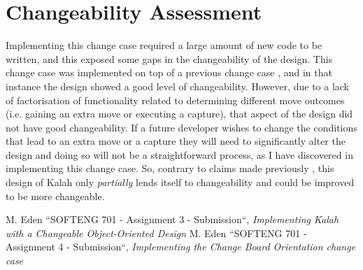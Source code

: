 \documentclass[10pt, a4paper, conference]{IEEEtran}
\begin{document}
\section{Changeability Assessment}
Implementing this change case required a large amount of new code to be
written, and this exposed some gaps in the changeability of the design. This
change case was implemented on top of a previous change case
\cite{a4-change-case}, and in that instance the design showed a good level of 
changeability. However, due to a lack of factorisation of functionality related
to determining different move outcomes (i.e. gaining an extra move or executing
a capture), that aspect of the design did not have good changeability. If
a future developer wishes to change the conditions that lead to an extra move
or a capture they will need to significantly alter the design and doing so will
not be a straightforward process, as I have discovered in implementing this
change case. So, contrary to claims made previously \cite{a3-design}, this
design of Kalah only \textit{partially} lends itself to changeability and could
be improved to be more changeable.

\begin{thebibliography}{00}
   M. Eden ``SOFTENG 701 - Assignment 3 - Submission``,
    \textit{Implementing Kalah with a Changeable Object-Oriented Design}
   M. Eden ``SOFTENG 701 - Assignment 4 - Submission``,
    \textit{Implementing the Change Board Orientation change case}
\end{thebibliography}
\end{document}
